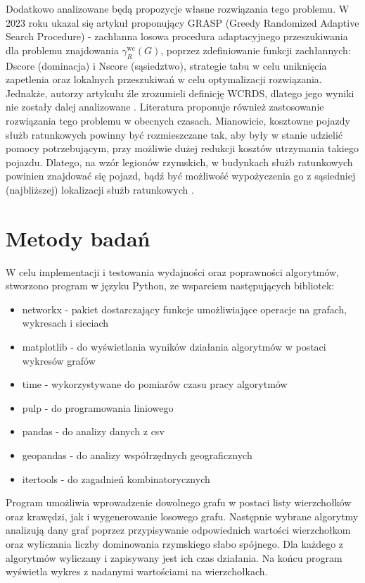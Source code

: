 Dodatkowo analizowane będą propozycje własne rozwiązania tego problemu.
W 2023 roku ukazal się artykuł proponujący GRASP (Greedy Randomized Adaptive Search Procedure) - zachłanna losowa procedura adaptacyjnego przeszukiwania dla problemu znajdowania $\gamma_{R}^{\text{wc}}(G)$, poprzez zdefiniowanie funkcji zachłannych: Dscore (dominacja) i Nscore (sąsiedztwo), strategie tabu w celu uniknięcia zapetlenia oraz lokalnych przeszukiwań w celu optymalizacji rozwiązania. Jednakże, autorzy artykułu źle zrozumieli definicję WCRDS, dlatego jego wyniki nie zostały dalej analizowane \cite{GRASP}.
Literatura proponuje również zastosowanie rozwiązania tego problemu w obecnych czasach. Mianowicie, kosztowne pojazdy służb ratunkowych powinny być rozmieszczane tak, aby były w stanie udzielić pomocy potrzebującym, przy możliwie dużej redukcji kosztów utrzymania takiego pojazdu. Dlatego, na wzór legionów rzymskich, w budynkach służb ratunkowych powinien znajdować się pojazd, bądź być możliwość wypożyczenia go z sąsiedniej (najbliższej) lokalizacji służb ratunkowych \cite{improvedILP}.

\section{Metody badań}
W celu implementacji i testowania wydajności oraz poprawności algorytmów, stworzono program w języku Python, ze wsparciem następujących bibliotek:
\begin{itemize}
    \item networkx - pakiet dostarczający funkcje umożliwiające operacje na grafach, wykresach i sieciach
    \item matplotlib - do wyświetlania wyników działania algorytmów w postaci wykresów grafów
    \item time - wykorzystywane do pomiarów czasu pracy algorytmów
    \item pulp - do programowania liniowego
    \item pandas - do analizy danych z csv
    \item geopandas - do analizy współrzędnych geograficznych
    \item itertools - do zagadnień kombinatorycznych
\end{itemize}

Program umożliwia wprowadzenie dowolnego grafu w postaci listy wierzchołków oraz krawędzi, jak i wygenerowanie losowego grafu. Następnie wybrane algorytmy analizują dany graf poprzez przypisywanie odpowiednich wartości wierzchołkom oraz wyliczania liczby dominowania rzymskiego słabo spójnego. Dla każdego z algorytmów wyliczany i zapisywany jest ich czas działania. Na końcu program wyświetla wykres z nadanymi wartościami na wierzchołkach.\\

